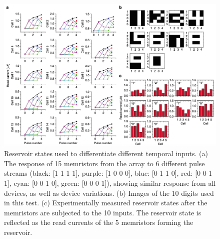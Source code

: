 \documentclass[11pt, oneside]{article}
\begin{document}
\begin{figure}[H]
    \centering
    \includegraphics[width=\textwidth]{figs/reservoir-memristor-2.png}

    \caption{Reservoir states used to differentiate different temporal inputs. (a) The response of 15 memristors from the array to 6 different pulse streams (black: [1 1 1 1], purple: [1 0 0 0], blue: [0 1 1 0], red: [0 0 1 1], cyan: [0 0 1 0], green: [0 0 0 1]), showing similar response from all devices, as well as device variations. (b) Images of the 10 digits used in this test. (c) Experimentally measured reservoir states after the memristors are subjected to the 10 inputs. The reservoir state is reflected as the read currents of the 5 memristors forming the reservoir.}
\end{figure}
\end{document}
